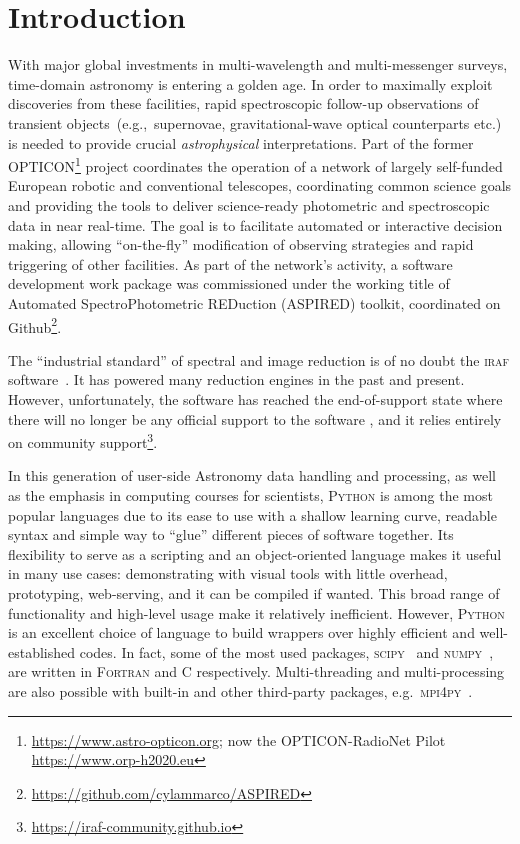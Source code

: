 \documentclass[twocolumn, linenumbers]{aastex631}
\begin{document}
\section{Introduction}
With major global investments in multi-wavelength and multi-messenger surveys, time-domain
astronomy is entering a golden age. In order to maximally exploit discoveries from these
facilities, rapid spectroscopic follow-up observations of transient objects~(e.g.,\ supernovae,
gravitational-wave optical counterparts etc.) is needed to provide crucial {\em astrophysical} 
interpretations. Part of the former OPTICON\footnote{\url{https://www.astro-opticon.org}; now the
OPTICON-RadioNet Pilot \url{https://www.orp-h2020.eu}} project coordinates the operation of a
network of largely self-funded European robotic and conventional telescopes, coordinating
common science goals and providing the tools to deliver science-ready photometric and
spectroscopic data in near real-time. The goal is to facilitate automated or interactive
decision making, allowing ``on-the-fly'' modification of observing strategies and rapid
triggering of other facilities. As part of the network's activity, a software development work package was
commissioned under the working title of Automated SpectroPhotometric REDuction (\textsc{ASPIRED})
toolkit, coordinated on Github\footnote{\url{https://github.com/cylammarco/ASPIRED}}.

The ``industrial standard'' of spectral and image reduction is of no doubt the
\textsc{iraf} software~\citep{1986SPIE..627..733T, 1993ASPC...52..173T}. It has powered many
reduction engines in the past and present. However, unfortunately, the software has reached
the end-of-support state where there will no longer be any official support to the software
, and it relies entirely on community support\footnote{\url{https://iraf-community.github.io}}.

In this generation of user-side Astronomy data handling and processing, as well as the emphasis in
computing courses for scientists, \textsc{Python} is among the most popular languages due to
its ease to use with a shallow learning curve, readable syntax and simple way to ``glue''
different pieces of software together. Its flexibility to serve as a scripting and an
object-oriented language makes it useful in many use cases: demonstrating with visual tools
with little overhead, prototyping, web-serving, and it can be compiled if wanted. This broad range of
functionality and high-level usage make it relatively inefficient. However, \textsc{Python}
is an excellent choice of language to build wrappers over highly efficient and well-established
codes. In fact, some of the most used packages,
\textsc{scipy}~\citep{2020SciPy-NMeth} and \textsc{numpy}~\citep{2020NumPy-Array},
are written in \textsc{Fortran} and \textsc{C} respectively. Multi-threading and multi-processing
are also possible with built-in and other third-party packages, e.g.\ \textsc{mpi4py}~\citep{DALCIN20111124}. 
\end{document}
